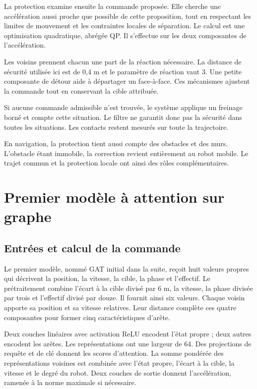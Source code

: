 La protection examine ensuite la commande proposée. Elle cherche une accélération aussi proche que possible de cette proposition, tout en respectant les limites de mouvement et les contraintes locales de séparation. Le calcul est une optimisation quadratique, abrégée QP. Il s'effectue sur les deux composantes de l'accélération.

Les voisins prennent chacun une part de la réaction nécessaire. La distance de sécurité utilisée ici est de 0,4 m et le paramètre de réaction vaut 3. Une petite composante de détour aide à départager un face-à-face. Ces mécanismes ajustent la commande tout en conservant la cible attribuée.

Si aucune commande admissible n'est trouvée, le système applique un freinage borné et compte cette situation. Le filtre ne garantit donc pas la sécurité dans toutes les situations. Les contacts restent mesurés sur toute la trajectoire.

En navigation, la protection tient aussi compte des obstacles et des murs. L'obstacle étant immobile, la correction revient entièrement au robot mobile. Le trajet commun et la protection locale ont ainsi des rôles complémentaires.

\section{Premier modèle à attention sur graphe}
\subsection{Entrées et calcul de la commande}
Le premier modèle, nommé GAT initial dans la suite, reçoit huit valeurs propres qui décrivent la position, la vitesse, la cible, la phase et l'effectif. Le prétraitement combine l'écart à la cible divisé par 6 m, la vitesse, la phase divisée par trois et l'effectif divisé par douze. Il fournit ainsi six valeurs. Chaque voisin apporte sa position et sa vitesse relatives. Leur distance complète ces quatre composantes pour former cinq caractéristiques d'arête.

Deux couches linéaires avec activation ReLU encodent l'état propre ; deux autres encodent les arêtes. Les représentations ont une largeur de 64. Des projections de requête et de clé donnent les scores d'attention. La somme pondérée des représentations voisines est combinée avec l'état propre, l'écart à la cible, la vitesse et le degré du robot. Deux couches de sortie donnent l'accélération, ramenée à la norme maximale si nécessaire.


